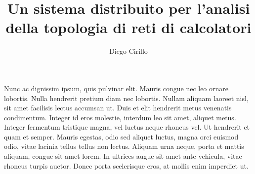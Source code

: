 \documentclass[target=bach,aauheader=,style=]{thud}
\title{Un sistema distribuito per l'analisi della topologia di reti di calcolatori}
\author{Diego Cirillo}
\begin{document}
\maketitle



\abstract
Nunc ac dignissim ipsum, quis pulvinar elit. Mauris congue nec leo ornare lobortis. Nulla hendrerit pretium diam nec lobortis. Nullam aliquam laoreet nisl, sit amet facilisis lectus accumsan ut. Duis et elit hendrerit metus venenatis condimentum. Integer id eros molestie, interdum leo sit amet, aliquet metus. Integer fermentum tristique magna, vel luctus neque rhoncus vel. Ut hendrerit et quam et semper. Mauris egestas, odio sed aliquet luctus, magna orci euismod odio, vitae lacinia tellus tellus non lectus. Aliquam urna neque, porta et mattis aliquam, congue sit amet lorem. In ultrices augue sit amet ante vehicula, vitae rhoncus turpis auctor. Donec porta scelerisque eros, at mollis enim imperdiet ut. 

\tableofcontents



\mainmatter

\end{document}

